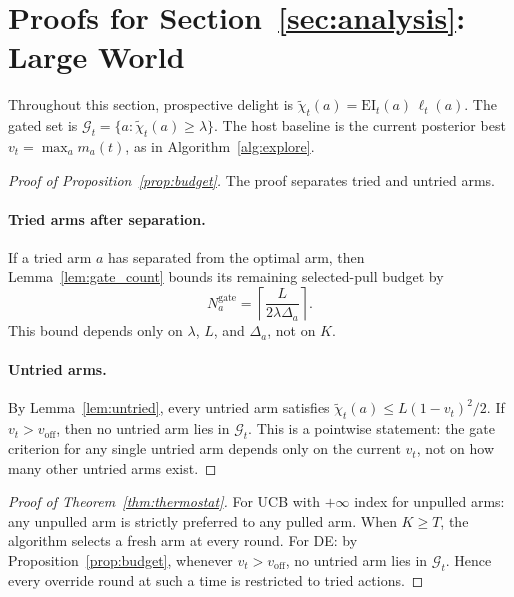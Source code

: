 \documentclass{article}
\newcommand{\Gc}{\mathcal{G}}
\newcommand{\surp}{\ell} %
\newcommand{\delight}{\chi} %
\newcommand{\EI}{\mathrm{EI}} %
\begin{document}
\section{Proofs for Section~\ref{sec:analysis}: Large World}
\label{app:proofs_large}

Throughout this section, prospective delight is $\tilde{\delight}_t(a) = \EI_t(a)\,\surp_t(a)$.
The gated set is $\Gc_t = \{a : \tilde{\delight}_t(a) \ge \lambda\}$.
The host baseline is the current posterior best $v_t = \max_a m_a(t)$, as in Algorithm~\ref{alg:explore}.

\begin{proof}[Proof of Proposition~\ref{prop:budget}]
The proof separates tried and untried arms.

\paragraph{Tried arms after separation.}
If a tried arm $a$ has separated from the optimal arm, then Lemma~\ref{lem:gate_count} bounds its remaining selected-pull budget by
\[
  N_a^{\mathrm{gate}}
  =
  \left\lceil \frac{L}{2\lambda\Delta_a}\right\rceil .
\]
This bound depends only on $\lambda$, $L$, and $\Delta_a$, not on $K$.


\paragraph{Untried arms.}
By Lemma~\ref{lem:untried}, every untried arm satisfies $\tilde{\delight}_t(a) \le L(1-v_t)^2/2$.
If $v_t > v_{\mathrm{off}}$, then no untried arm lies in $\Gc_t$.
This is a pointwise statement: the gate criterion for any single untried arm depends only on the current $v_t$, not on how many other untried arms exist.
\end{proof}

\begin{proof}[Proof of Theorem~\ref{thm:thermostat}]
For UCB with $+\infty$ index for unpulled arms: any unpulled arm is strictly preferred to any pulled arm.
When $K \ge T$, the algorithm selects a fresh arm at every round.
For DE: by Proposition~\ref{prop:budget}, whenever $v_t > v_{\mathrm{off}}$, no untried arm lies in $\Gc_t$.
Hence every override round at such a time is restricted to tried actions.
\end{proof}







\end{document}
